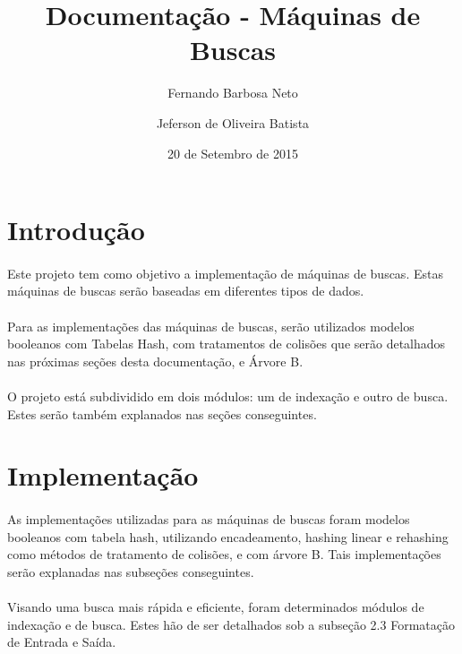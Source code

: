\documentclass[12pt,a4paper]{article}
\title{Documentação - Máquinas de Buscas}
\author{Fernando Barbosa Neto \and Jeferson de Oliveira Batista}
\date{20 de Setembro de 2015}
\begin{document}
 \maketitle
 \newpage
 
 \section{Introdução}
 {\paragraph{} Este projeto tem como objetivo a implementação de máquinas de buscas. Estas máquinas de buscas serão baseadas em diferentes tipos de dados. }
 {\paragraph{} Para as implementações das máquinas de buscas, serão utilizados modelos booleanos com Tabelas Hash, com tratamentos de colisões que serão detalhados nas próximas seções desta documentação, e Árvore B. }
 {\paragraph{} O projeto está subdividido em dois módulos: um de indexação e outro de busca. Estes serão também explanados nas seções conseguintes. }
 \newpage
 
 \section{Implementação}  
  {\paragraph{} As implementações utilizadas para as máquinas de buscas foram modelos booleanos com tabela hash, utilizando encadeamento, hashing linear e rehashing como métodos de tratamento de colisões, e com árvore B. Tais implementações serão explanadas nas subseções conseguintes.}
  {\paragraph{} Visando uma busca mais rápida e eficiente, foram determinados módulos de indexação e de busca. Estes hão de ser detalhados sob a subseção 2.3 Formatação de Entrada e Saída.}
  
\end{document}
